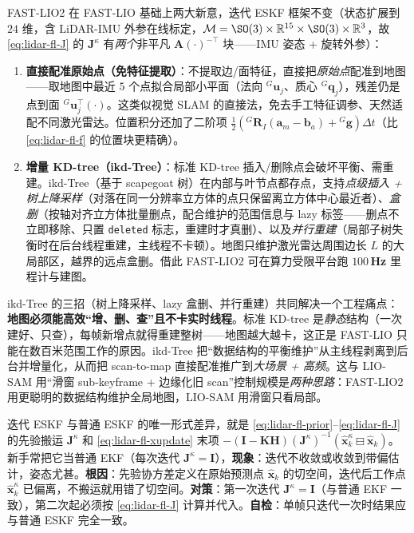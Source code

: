 FAST-LIO2\cite{xu2022fastlio2} 在 FAST-LIO 基础上两大新意，迭代 ESKF 框架不变（状态扩展到 $24$ 维，含 LiDAR-IMU 外参在线标定，$\mathcal{M}=\SO(3)\times\mathbb{R}^{15}\times\SO(3)\times\mathbb{R}^3$，故 \cref{eq:lidar-fl-J} 的 $\mathbf{J}^\kappa$ 有\emph{两个}非平凡 $\mathbf{A}(\cdot)^{-\top}$ 块——IMU 姿态 + 旋转外参）：

\begin{enumerate}
  \item \textbf{直接配准原始点（免特征提取）}：不提取边/面特征，直接把\emph{原始点}配准到地图——取地图中最近 $5$ 个点拟合局部小平面（法向 ${}^G\mathbf{u}_j$、质心 ${}^G\mathbf{q}_j$），残差仍是点到面 ${}^G\mathbf{u}_j^\top(\cdot)$。这类似视觉 SLAM 的直接法，免去手工特征调参、天然适配不同激光雷达。位置积分还加了二阶项 $\tfrac12({}^G\mathbf{R}_I(\mathbf{a}_m-\mathbf{b}_a)+{}^G\mathbf{g})\Delta t$（比 \cref{eq:lidar-fl-f} 的位置块更精确）。
  \item \textbf{增量 KD-tree（ikd-Tree）}：标准 KD-tree 插入/删除点会破坏平衡、需重建。ikd-Tree\cite{cai2021ikdtree}（基于 scapegoat 树）在内部与叶节点都存点，支持\emph{点级插入 + 树上降采样}（对落在同一分辨率立方体的点只保留离立方体中心最近者）、\emph{盒删}（按轴对齐立方体批量删点，配合维护的范围信息与 lazy 标签——删点不立即移除、只置 \texttt{deleted} 标志，重建时才真删）、以及\emph{并行重建}（局部子树失衡时在后台线程重建，主线程不卡顿）。地图只维护激光雷达周围边长 $L$ 的大局部区，越界的远点盒删。借此 FAST-LIO2 可在算力受限平台跑 \textbf{$100$\,Hz} 里程计与建图。
\end{enumerate}

\begin{insight}
ikd-Tree 的三招（树上降采样、lazy 盒删、并行重建）共同解决一个工程痛点：\textbf{地图必须能高效“增、删、查”且不卡实时线程}。标准 KD-tree 是\emph{静态}结构（一次建好、只查），每帧新增点就得重建整树——地图越大越卡，这正是 FAST-LIO 只能在数百米范围工作的原因。ikd-Tree 把“数据结构的平衡维护”从主线程剥离到后台并增量化，从而把 scan-to-map 直接配准推广到\emph{大场景 + 高频}。这与 LIO-SAM 用“滑窗 sub-keyframe + 边缘化旧 scan”控制规模是\emph{两种思路}：FAST-LIO2 用更聪明的数据结构维护全局地图，LIO-SAM 用滑窗只看局部。
\end{insight}

\begin{pitfall}
迭代 ESKF 与普通 ESKF 的唯一形式差异，就是 \cref{eq:lidar-fl-prior}–\cref{eq:lidar-fl-J} 的先验搬运 $\mathbf{J}^\kappa$ 和 \cref{eq:lidar-fl-xupdate} 末项 $-(\mathbf{I}-\mathbf{K}\mathbf{H})(\mathbf{J}^\kappa)^{-1}(\hat{\mathbf{x}}^\kappa_k\boxminus\hat{\mathbf{x}}_k)$。新手常把它当普通 EKF（每次迭代 $\mathbf{J}^\kappa=\mathbf{I}$），\textbf{现象}：迭代不收敛或收敛到带偏估计，姿态尤甚。\textbf{根因}：先验协方差定义在原始预测点 $\hat{\mathbf{x}}_k$ 的切空间，迭代后工作点 $\hat{\mathbf{x}}^\kappa_k$ 已偏离，不搬运就用错了切空间。\textbf{对策}：第一次迭代 $\mathbf{J}^\kappa=\mathbf{I}$（与普通 EKF 一致），第二次起必须按 \cref{eq:lidar-fl-J} 计算并代入。\textbf{自检}：单帧只迭代一次时结果应与普通 ESKF 完全一致。
\end{pitfall}

